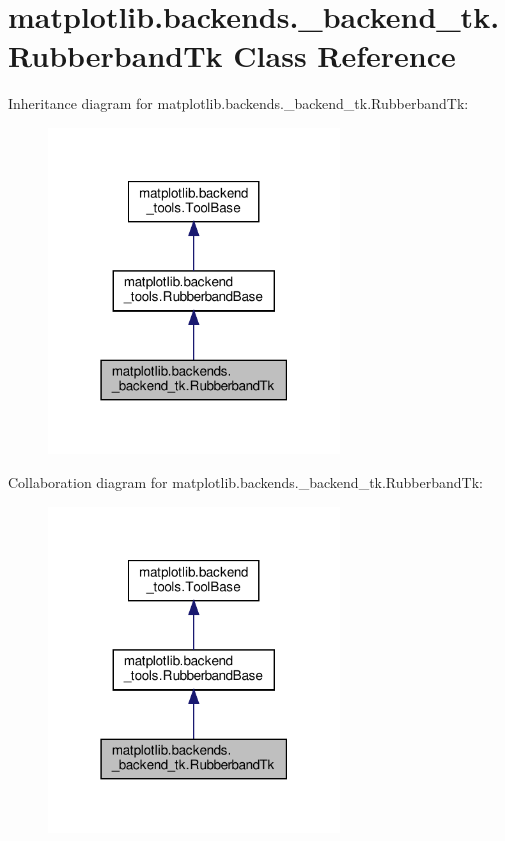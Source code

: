 \hypertarget{classmatplotlib_1_1backends_1_1__backend__tk_1_1RubberbandTk}{}\section{matplotlib.\+backends.\+\_\+backend\+\_\+tk.\+Rubberband\+Tk Class Reference}
\label{classmatplotlib_1_1backends_1_1__backend__tk_1_1RubberbandTk}


Inheritance diagram for matplotlib.\+backends.\+\_\+backend\+\_\+tk.\+Rubberband\+Tk\+:
\nopagebreak
\begin{figure}[H]
\begin{center}
\leavevmode
\includegraphics[width=219pt]{classmatplotlib_1_1backends_1_1__backend__tk_1_1RubberbandTk__inherit__graph}
\end{center}
\end{figure}


Collaboration diagram for matplotlib.\+backends.\+\_\+backend\+\_\+tk.\+Rubberband\+Tk\+:
\nopagebreak
\begin{figure}[H]
\begin{center}
\leavevmode
\includegraphics[width=219pt]{classmatplotlib_1_1backends_1_1__backend__tk_1_1RubberbandTk__coll__graph}
\end{center}
\end{figure}
